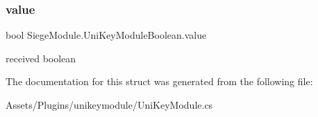 \mbox{\label{struct_siege_module_1_1_uni_key_module_boolean_aeaf91918c514973225ad65bec8df4ac5}} 
\subsubsection{\texorpdfstring{value}{value}}
{\footnotesize\ttfamily bool Siege\+Module.\+Uni\+Key\+Module\+Boolean.\+value}



received boolean 



The documentation for this struct was generated from the following file\+:\begin{DoxyCompactItemize}
\item 
Assets/\+Plugins/unikeymodule/Uni\+Key\+Module.\+cs\end{DoxyCompactItemize}
